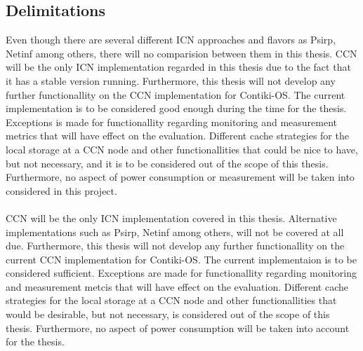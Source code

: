 \subsection{Delimitations}
Even though there are several different ICN approaches and flavors as Psirp, Netinf among others, there will no comparision between them in this thesis. CCN will be the only ICN implementation regarded in this thesis due to the fact that it has a stable version running. 
Furthermore, this thesis will not develop any further functionallity on the CCN implementation for Contiki-OS. The current implementation is to be considered good enough during the time for the thesis. Exceptions is made for functionallity regarding monitoring and measurement metrics that will have effect on the evaluation. Different cache strategies for the local storage at a CCN node and other functionallities that could be nice to have, but not necessary, and it is to be considered out of the scope of this thesis. Furthermore, no aspect of power consumption or measurement will be taken into considered in this project.
\\\\
CCN will be the only ICN implementation covered in this thesis. Alternative implementations such as Psirp, Netinf among others, will not be covered at all due.
Furthermore, this thesis will not develop any further functionallity on the current CCN implementation for Contiki-OS. The current implementaion is to be considered sufficient. Exceptions are made for functionallity regarding monitoring and measurement metcis that will have effect on the evaluation. Different cache strategies for the local storage at a CCN node and other functionallities that would be desirable, but not necessary, is considered out of the scope of this thesis. Furthermore, no aspect of power consumption will be taken into account for the thesis.

